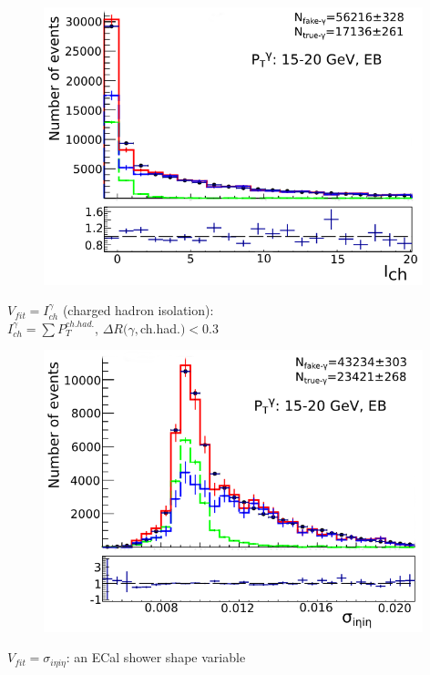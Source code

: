 \begin{frame}
\begin{minipage}[t]{0.49\textwidth}
  \begin{figure}[htb]
    \begin{center}
       \includegraphics[width=0.98\textwidth]{../figs/ForPresentation/fitPlot_CHISO.png}
    \end{center}
  \end{figure}
    \begin{center}
       \tiny
       $V_{fit}=I_{ch}^{\gamma}$ (charged hadron isolation):\\
       $I_{ch}^{\gamma} = \sum P_T^{ch.had.}$, $\Delta R(\gamma,$ch.had.$)<$0.3\\
    \end{center}
\end{minipage}%
\begin{minipage}[t]{0.49\textwidth}
  \begin{figure}[htb]
    \begin{center}
      \includegraphics[width=0.98\textwidth]{../figs/ForPresentation/fitPlot_SIHIH.png}
    \end{center}
  \end{figure}
    \begin{center}
      \tiny
      $V_{fit}=\sigma_{i\eta i\eta}$: an ECal shower shape variable\\
    \end{center}
\end{minipage} 


\end{frame}
